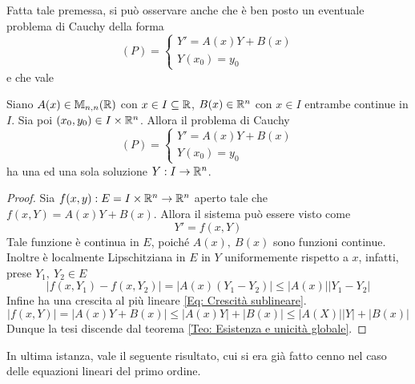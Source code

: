 Fatta tale premessa, si può osservare anche che è ben posto un eventuale problema di Cauchy della forma
\begin{equation}
    (P)=\begin{cases}
        Y'=A(x)Y+B(x)\\
        Y(x_0)=y_0
    \end{cases}
\end{equation}
e che vale
\begin{theorem}
    Siano $A(x) \in \mathbb{M}_{n,n}(\mathbb{R})$ con $x \in I \subseteq \mathbb{R}$, $B(x) \in \mathbb{R}^n$ con $x \in I$ entrambe continue in $I$. Sia poi $(x_0, y_0) \in I \times \mathbb{R}^n$. Allora il problema di Cauchy
    \begin{equation}
    (P)=\begin{cases}
        Y'=A(x)Y+B(x)\\
        Y(x_0)=y_0
    \end{cases}
    \end{equation}
    ha una ed una sola soluzione $Y: I \to \mathbb{R}^n$.
\end{theorem}
\begin{proof}
    Sia $f(x,y): E=I \times \mathbb{R}^n \to \mathbb{R}^n$ aperto tale che $f(x,Y)=A(x)Y+B(x)$. Allora il sistema può essere visto come 
    \begin{equation}
        Y'=f(x, Y)
    \end{equation}
    Tale funzione è continua in $E$, poiché $A(x),\ B(x)$ sono funzioni continue.
    Inoltre è localmente Lipschitziana in $E$ in $Y$ uniformemente rispetto a $x$, infatti, prese $Y_1,\ Y_2 \in E$
    \begin{equation}
    |f(x, Y_1)- f(x, Y_2)|=|A(x)(Y_1-Y_2)|\leq |A(x)||Y_1-Y_2|
    \end{equation}
    Infine ha una crescita al più lineare \eqref{Eq: Crescità sublineare}. 
    \begin{equation}
        |f(x, Y)|=|A(x)Y+B(x)| \leq |A(x)Y|+|B(x)| \leq |A(X)||Y|+|B(x)|
    \end{equation}
    Dunque la tesi discende dal teorema \ref{Teo: Esistenza e unicità globale}.
\end{proof}
In ultima istanza, vale il seguente risultato, cui si era già fatto cenno nel caso delle equazioni lineari del primo ordine.
